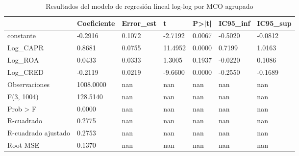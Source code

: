 \begin{table}[htbp]
\centering
\caption{Resultados del modelo de regresión lineal log-log por MCO agrupado}
\begin{tabular}{lllllll}
\hline
 & Coeficiente & Error\_est & t & P>|t| & IC95\_inf & IC95\_sup \\
\hline
constante & -0.2916 & 0.1072 & -2.7192 & 0.0067 & -0.5020 & -0.0812 \\
Log\_CAPR & 0.8681 & 0.0755 & 11.4952 & 0.0000 & 0.7199 & 1.0163 \\
Log\_ROA & 0.0433 & 0.0333 & 1.3005 & 0.1937 & -0.0220 & 0.1086 \\
Log\_CRED & -0.2119 & 0.0219 & -9.6600 & 0.0000 & -0.2550 & -0.1689 \\
Observaciones & 1008.0000 & nan & nan & nan & nan & nan \\
F(3, 1004) & 128.5140 & nan & nan & nan & nan & nan \\
Prob > F & 0.0000 & nan & nan & nan & nan & nan \\
R-cuadrado & 0.2775 & nan & nan & nan & nan & nan \\
R-cuadrado ajustado & 0.2753 & nan & nan & nan & nan & nan \\
Root MSE & 0.1370 & nan & nan & nan & nan & nan \\
\hline
\end{tabular}
\label{tab:tabla5a_regresion_MCO_loglog}
\end{table}